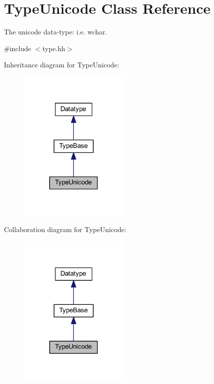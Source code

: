 \hypertarget{class_type_unicode}{}\section{Type\+Unicode Class Reference}
\label{class_type_unicode}


The unicode data-\/type\+: i.\+e. wchar.  




{\ttfamily \#include $<$type.\+hh$>$}



Inheritance diagram for Type\+Unicode\+:
\nopagebreak
\begin{figure}[H]
\begin{center}
\leavevmode
\includegraphics[width=153pt]{class_type_unicode__inherit__graph}
\end{center}
\end{figure}


Collaboration diagram for Type\+Unicode\+:
\nopagebreak
\begin{figure}[H]
\begin{center}
\leavevmode
\includegraphics[width=153pt]{class_type_unicode__coll__graph}
\end{center}
\end{figure}
